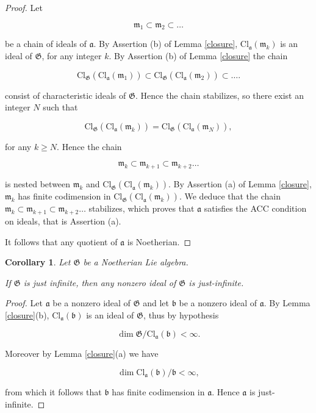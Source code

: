 \documentclass[11pt, letterpaper, reqno]{amsart}
\newtheorem{cor}[theorem]{Corollary}
\theoremstyle{definition}
\newcommand{\fa}{\mathfrak{a}}
\newcommand{\fb}{\mathfrak{b}}
\newcommand{\fm}{\mathfrak{m}}
\newcommand{\fG}{\mathfrak{G}}
\newcommand{\Cl}{\mathrm{Cl}}
\begin{document}
\begin{proof} Let

$$\fm_1\subset\fm_2\subset\ldots$$

\noindent be a chain of ideals of $\fa$. By Assertion (b) of Lemma \ref{closure}, 
 $\Cl_\fa(\fm_k)$ is an
ideal of $\fG$, for any integer $k$.
By Assertion (b) of Lemma \ref{closure}
the chain 

$$\Cl_\fG( \Cl_\fa(\fm_1))
\subset\Cl_\fG( \Cl_\fa(\fm_2))\subset\ldots.$$

\noindent consist of characteristic ideals of $\fG$. Hence the chain stabilizes,
so there exist an integer $N$ such that

$$\Cl_\fG( \Cl_\fa(\fm_k))=\Cl_\fG( \Cl_\fa(\fm_N)),$$

\noindent for any $k\geq N$. Hence the chain

$$\fm_k\subset\fm_{k+1}\subset
\fm_{k+2}\ldots$$

\noindent is nested between $\fm_k$ and
$\Cl_\fG( \Cl_\fa(\fm_k))$. By Assertion (a)
of Lemma \ref{closure}, $\fm_k$ has finite codimension in
$\Cl_\fG( \Cl_\fa(\fm_k))$. We deduce that the
chain $\fm_k\subset\fm_{k+1}\subset
\fm_{k+2}\ldots$ stabilizes, which proves that $\fa$ satisfies the ACC condition on ideals,
that is Assertion (a).

It follows that any quotient of $\fa$ is Noetherian.
\end{proof}

\begin{cor}\label{ideal-just} Let $\fG$ be a Noetherian Lie algebra. 

If $\fG$ is just infinite,
then any nonzero ideal of $\fG$ is just-infinite.
\end{cor}

\begin{proof} Let $\fa$ be a nonzero ideal
of $\fG$ and let $\fb$ be a nonzero  ideal
of $\fa$. By Lemma \ref{closure}(b),
$\Cl_{\fa}(\fb)$ is an ideal of 
$\fG$, thus by hypothesis

$$\dim \fG/\Cl_{\fa}(\fb)<\infty.$$

\noindent Moreover by Lemma \ref{closure}(a)
we have

$$\dim \Cl_{\fa}(\fb)/\fb<\infty,$$

\noindent from which it follows that 
$\fb$ has finite codimension in $\fa$. Hence
$\fa$ is just-infinite.
\end{proof}
\end{document}
